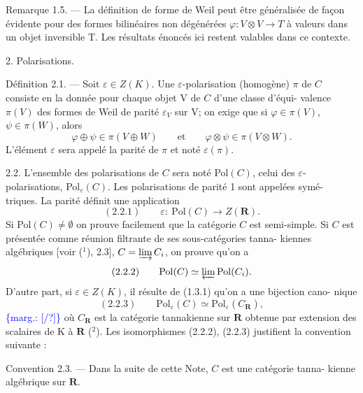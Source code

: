\documentclass[11pt]{article}
\newcommand{\scanpage}[1]{\par\bigskip\noindent{\small\sffamily[scan #1]}\par}
\newcommand{\mspage}[1]{{\small\sffamily[p.\,#1]}}
\newcommand{\hand}[1]{\textcolor{blue}{#1}}
\newcommand{\margin}[1]{\textcolor{blue}{\{\textsf{marg.:} #1\}}}
\newcommand{\unsure}[1]{[#1?]}
\begin{document}
Remarque 1.5. --- La définition de forme de Weil peut être généralisée
de façon évidente pour des formes bilinéaires non dégénérées $\varphi : V \otimes V \to T$
à valeurs dans un objet inversible T. Les résultats énoncés ici restent
valables dans ce contexte.

2. Polarisations.

Définition 2.1. --- Soit $\varepsilon \in Z(K)$. Une $\varepsilon$-polarisation (homogène) $\pi$
de $C$ consiste en la donnée pour chaque objet V de $C$ d'une classe d'équi-%
valence $\pi(V)$ des formes de Weil de parité $\varepsilon_V$ sur V; on exige que si
$\varphi \in \pi(V)$, $\psi \in \pi(W)$, alors
\[ \varphi \oplus \psi \in \pi (V \oplus W) \qquad \text{et} \qquad \varphi \otimes \psi \in \pi (V \otimes W). \]
L'élément $\varepsilon$ sera appelé la parité de $\pi$ et noté $\varepsilon(\pi)$.

2.2. L'ensemble des polarisations de $C$ sera noté Pol$(C)$, celui des
$\varepsilon$-polarisations, Pol$_\varepsilon(C)$. Les polarisations de parité 1 sont appelées symé-%
triques. La parité définit une application
\[ (2.2.1) \qquad \varepsilon : \ \mathrm{Pol}(C) \to Z(\mathbf{R}). \]
Si Pol$(C) \neq \emptyset$ on prouve facilement que la catégorie $C$ est semi-simple.
Si $C$ est présentée comme réunion filtrante de ses sous-catégories tanna-%
kiennes algébriques [voir (${}^1$), 2.3], $C = \varinjlim C_i$, on prouve qu'on a
\[ (2.2.2) \qquad \mathrm{Pol}(C) \simeq \varprojlim \mathrm{Pol}(C_i). \]
D'autre part, si $\varepsilon \in Z(K)$, il résulte de (1.3.1) qu'on a une bijection cano-%
nique
\[ (2.2.3) \qquad \mathrm{Pol}_\varepsilon(C) \simeq \mathrm{Pol}_\varepsilon(C_{\mathbf{R}}), \] \margin{\unsure{/}}
où $C_{\mathbf{R}}$ est la catégorie tannakienne sur $\mathbf{R}$ obtenue par extension des
scalaires de K à $\mathbf{R}$ (${}^2$). Les isomorphismes (2.2.2), (2.2.3) justifient la
convention suivante :

Convention 2.3. --- Dans la suite de cette Note, $C$ est une catégorie tanna-%
kienne algébrique sur $\mathbf{R}$.

\mspage{\hand{62}}

\clearpage
\scanpage{119/63}
\mspage{( 3 )}
\end{document}

